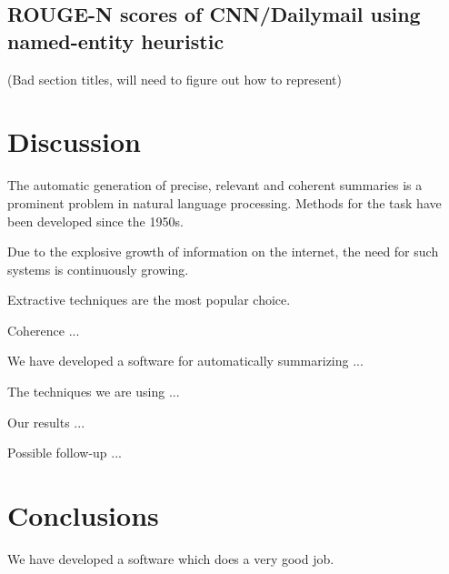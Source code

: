 \documentclass[conference]{IEEEtran}
\begin{document}
\subsection{ROUGE-N scores of CNN/Dailymail using named-entity heuristic}
(Bad section titles, will need to figure out how to represent) 


\section{Discussion}\label{discussion}
The automatic generation of precise, relevant and coherent summaries is a prominent problem in natural language processing. Methods for the task have been developed since the 1950s. 

Due to the explosive growth of information on the internet, the need for such systems is continuously growing. 

Extractive techniques are the most popular choice.

Coherence ...

We have developed a software for automatically summarizing ...

The techniques we are using ...

Our results ...

Possible follow-up ...

\section{Conclusions}\label{conclusions}
We have developed a software which does a very good job.
\end{document}
